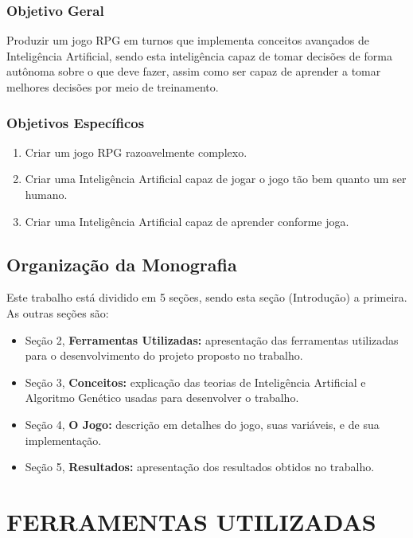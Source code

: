 \documentclass[12pt,a4paper]{article}
\begin{document}
		\subsubsection{Objetivo Geral}
			Produzir um jogo RPG em turnos que implementa conceitos avançados de Inteligência Artificial,
			sendo esta inteligência capaz de tomar decisões de forma autônoma sobre o que deve fazer,
			assim como ser capaz de aprender a tomar melhores decisões por meio de treinamento.
		
		\subsubsection{Objetivos Específicos}
			\begin{enumerate}[noitemsep]
				\item Criar um jogo RPG razoavelmente complexo.
				\item Criar uma Inteligência Artificial capaz de jogar o jogo tão bem quanto um ser humano.
				\item Criar uma Inteligência Artificial capaz de aprender conforme joga.
			\end{enumerate}			
	
	\subsection{Organização da Monografia}
		Este trabalho está dividido em 5 seções, sendo esta seção (Introdução) a primeira. As outras seções são:
		\begin{itemize}[noitemsep]
     		\item Seção 2, \textbf{Ferramentas Utilizadas:} apresentação das ferramentas utilizadas para o desenvolvimento do projeto proposto no trabalho.
     		\item Seção 3, \textbf{Conceitos:} explicação das teorias de Inteligência Artificial e Algoritmo Genético usadas para desenvolver o trabalho.
     		\item Seção 4, \textbf{O Jogo:} descrição em detalhes do jogo, suas variáveis, e de sua implementação.
     		\item Seção 5, \textbf{Resultados:} apresentação dos resultados obtidos no trabalho.
  	 	\end{itemize}

\newpage %
\section{FERRAMENTAS UTILIZADAS}
\end{document}
